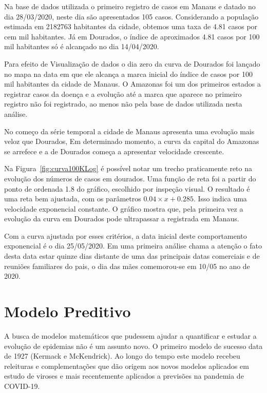 \documentclass[12pt]{article}
\begin{document}
Na base de dados utilizada o primeiro registro de casos em Manaus e datado no dia 28/03/2020, neste dia são apresentados 105 casos. Considerando a população estimada em 2182763 habitantes da cidade, obtemos uma taxa de 4.81 casos por cem mil habitantes. Já em Dourados, o índice de aproximados 4.81 casos por 100 mil habitantes só é alcançado no dia 14/04/2020.

Para efeito de Visualização de dados o dia zero da curva de Dourados foi lançado no mapa na data em que ele alcança a marca inicial do índice de casos por 100 mil habitantes da cidade de Manaus. O Amazonas foi um dos primeiros estados a registrar casos da doença e a evolução até a marca que aparece no primeiro registro não foi registrado, ao menos não pela base de dados utilizada nesta análise. 


No começo da série temporal a cidade de Manaus apresenta uma evolução mais veloz que Dourados, Em determinado momento, a curva da capital do Amazonas se arrefece e a de Dourados começa a apresentar velocidade crescente.

Na Figura~\ref{fig:curva100KLog} é possível notar um trecho praticamente reto na evolução dos números de casos em dourados. Uma função de reta foi a partir do ponto de ordenada 1.8 do gráfico, escolhido por inspeção visual. O resultado é uma reta bem ajustada, com os parâmetros \(0.04 \times x + 0.285\). Isso indica uma velocidade exponencial constante. O gráfico mostra que, pela primeira vez a evolução da curva em Dourados pode ultrapassar a registrada em Manaus.

Com a curva ajustada por esses critérios, a data inicial deste comportamento exponencial é o dia 25/05/2020. Em uma primeira análise chama a atenção o fato desta data estar quinze dias distante de uma das principais datas comerciais e de reuniões familiares do pais, o dia das mães comemorou-se em 10/05 no ano de 2020. 

\section{Modelo Preditivo}

A busca de modelos matemáticos que pudessem ajudar a quantificar e estudar a evolução de epidemias não é um assunto novo. O primeiro modelo de sucesso data de 1927 (Kermack e McKendrick)\cite{doi:10.1098/rspa.1927.0118}. Ao longo do tempo este modelo recebeu releituras e complementações que dão origem aos novos modelos aplicados em estudo de viroses e mais recentemente aplicados a previsões na pandemia de COVID-19. 
\end{document}
